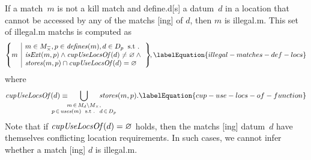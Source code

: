If a \gls{match}~$m$ is not a \gls{kill match} and \gls{define.d}[s] a
\gls{datum}~$d$ in a \gls{location} that cannot be accessed by any of the
\glspl{match} [ing] of $d$\hspace{-.8pt}, then $m$ is
\gls{illegal.m}.
%
This set of \gls{illegal.m} \glspl{match} is computed as
%
\begin{equation}
  \mSetBuilder*{m}%
               {%
                 \begin{array}{@{}l@{}}
                   m \in \mKillMatchCompSet,
                   p \in \mDefines(m),
                   d \in \mDataSet[p] \hspace{-1pt} \text{ \st} \\
                   \mIsExt(m, p)
                   \mAnd
                   \mCupUseLocsOf(d) \neq \mEmptySet
                   \mAnd \mbox{} \\
                   \mStores(m, p) \cap \mCupUseLocsOf(d) = \mEmptySet
                 \end{array}
               }\!\!,
  \labelEquation{illegal-matches-def-locs}
\end{equation}
%
where
%
\begin{equation}
  \mCupUseLocsOf(d)
  \equiv
  \hspace{-2.5em}
  \bigcup_{
    \substack{
      m \, \in \, \mMatchSet[d] \setminus \mKillMatchSet, \\
      p \, \in \, \mUses(m)
      \text{ \st } d \, \in \, \mDataSet[p]
    }
  }
    \hspace{-2.5em}
    \mStores(m, p).
  \labelEquation{cup-use-locs-of-function}
\end{equation}
%
Note that if \mbox{$\operatorname{\textrm{\textit{cupUseLocsOf}}}(d) = \varnothing$} holds, then the
\glspl{match} [ing] \gls{datum}~$d$ have themselves conflicting
\gls{location} requirements.
%
In such cases, we cannot infer whether a \gls{match} [ing]
$d$ is \gls{illegal.m}.

